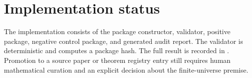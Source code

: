 \documentclass[11pt]{article}
\begin{document}
\section{Implementation status}
The implementation consists of the package constructor, validator, positive package, negative control package, and generated audit report. The validator is deterministic and computes a package hash. The full result is recorded in . Promotion to a source paper or theorem registry entry still requires human mathematical curation and an explicit decision about the finite-universe premise.

\printbibliography
\end{document}
